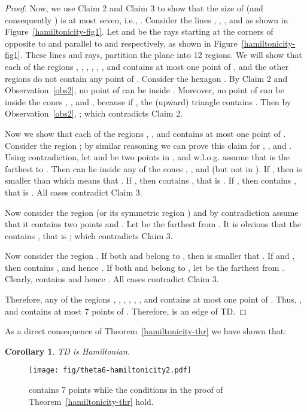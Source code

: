 \documentclass[11pt,a4paper]{article}
\newcommand{\kTD}[2]{\text{-}TD#2}
\newtheorem{corollary}{Corollary}
\begin{document}
\begin{proof}
Now, we use Claim 2 and Claim 3 to show that the size of  (and consequently ) is at most seven, i.e., .
Consider the lines , , , and  as shown in Figure~\ref{hamiltonicity-fig1}. Let  and  be the rays starting at the corners of  opposite to  and parallel to  and  respectively, as shown in Figure~\ref{hamiltonicity-fig1}. These lines and rays, partition the plane into 12 regions. We will show that each of the regions , , , , , , and  contains at most one point of , and the other regions do not contain any point of . Consider the hexagon . By Claim 2 and Observation~\ref{obs2}, no point of  can be inside . Moreover, no point of  can be inside the cones , , and , because if , the (upward) triangle  contains . Then by Observation~\ref{obs2}, ; which contradicts Claim 2.

Now we show that each of the regions , ,  and  contains at most one point of . Consider the region ; by similar reasoning we can prove this claim for , , and . Using contradiction, let  and  be two points in , and w.l.o.g. assume that  is the farthest to . Then  can lie inside any of the cones , , and  (but not in ). If , then  is smaller than  which means that . If , then  contains , that is . If , then  contains , that is . All cases contradict Claim 3. 

Now consider the region  (or its symmetric region ) and by contradiction assume that it contains two points  and . Let  be the farthest from . It is obvious that the  contains , that is ; which contradicts Claim 3. 

Now consider the region . If both  and  belong to , then  is smaller that . If  and , then  contains , and hence . If both  and  belong to , let  be the farthest from . Clearly,  contains  and hence . All cases contradict Claim 3.

Therefore, any of the regions , , , , , , and  contains at most one point of . Thus, , and  contains at most 7 points of . Therefore,  is an edge of \kTD{7}{}.
\end{proof}

As a direct consequence of Theorem~\ref{hamiltonicity-thr} we have shown that:
\begin{corollary}
 \kTD{7}{} is Hamiltonian.
\end{corollary}

\begin{figure}[htb]
  \centering
  \texttt{[image: fig/theta6-hamiltonicity2.pdf]}
 \caption{ contains 7 points while the conditions in the proof of Theorem~\ref{hamiltonicity-thr} hold.}
  \label{hamiltonicity-fig2}
\end{figure}
\end{document}
